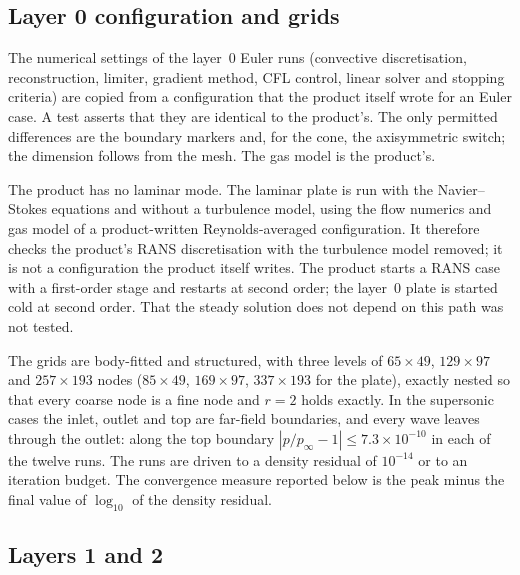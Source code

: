 \documentclass[11pt,a4paper]{article}
\newcommand{\pinf}{p_\infty}
\begin{document}
\subsection{Layer 0 configuration and grids}
\label{sec:l0setup}

The numerical settings of the layer~0 Euler runs (convective discretisation, reconstruction, limiter, gradient
method, CFL control, linear solver and stopping criteria) are copied from a configuration that the product itself
wrote for an Euler case.
A test asserts that they are identical to the product's.
The only permitted differences are the boundary markers and, for the cone, the axisymmetric switch; the dimension
follows from the mesh.
The gas model is the product's.

The product has no laminar mode.
The laminar plate is run with the Navier--Stokes equations and without a turbulence model, using the flow
numerics and gas model of a product-written Reynolds-averaged configuration.
It therefore checks the product's RANS discretisation with the turbulence model removed;
it is not a configuration the product itself writes.
The product starts a RANS case with a first-order stage and restarts at second order; the layer~0 plate is
started cold at second order.
That the steady solution does not depend on this path was not tested.

The grids are body-fitted and structured, with three levels of $65\times49$, $129\times97$ and $257\times193$
nodes ($85\times49$, $169\times97$, $337\times193$ for the plate), exactly nested so that every coarse node is a
fine node and $r=2$ holds exactly.
In the supersonic cases the inlet, outlet and top are far-field boundaries, and every wave leaves through the
outlet: along the top boundary $|p/\pinf-1|\le7.3\times10^{-10}$ in each of the twelve runs.
The runs are driven to a density residual of $10^{-14}$ or to an iteration budget.
The convergence measure reported below is the peak minus the final value of $\log_{10}$ of the density residual.

\subsection{Layers 1 and 2}
\label{sec:l12setup}
\end{document}
